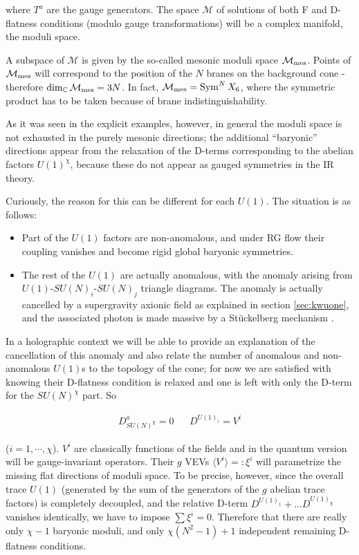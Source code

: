 where $T^a$ are the gauge generators. The space $\mathcal{M}$ of solutions of both F and D-flatness conditions (modulo gauge transformations) will be a complex manifold, the moduli space.

A subspace of $\mathcal{M}$ is given by the so-called mesonic moduli space $\mathcal{M}_\mathrm{mes}$. Points of $\mathcal{M}_\mathrm{mes}$ will correspond to the position of the $N$ branes on the background cone - therefore $\dim_\mathbb{C} \mathcal{M}_\mathrm{mes} = 3N$. In fact, $\mathcal{M}_\mathrm{mes} = \operatorname{Sym}^N X_6$, where the symmetric product has to be taken because of brane indistinguishability.

As it was seen in the explicit examples, however, in general the moduli space is not exhausted in the purely mesonic directions; the additional ``baryonic'' directions appear from the relaxation of the D-terms corresponding to the abelian factors $U(1)^\chi$, because these do not appear as gauged symmetries in the IR theory.

Curiously, the reason for this can be different for each $U(1)$. The situation is as follows:

\begin{itemize}
	\item Part of the $U(1)$ factors are non-anomalous, and under RG flow their coupling vanishes and become rigid global baryonic symmetries.
	\item The rest of the $U(1)$ are actually anomalous, with the anomaly arising from $U(1)$-$SU(N)_i$-$SU(N)_j$ triangle diagrams. The anomaly is actually cancelled by a supergravity axionic field as explained in section \ref{sec:kwuone}, and the associated photon is made massive by a St\"uckelberg mechanism \cite{Martelli:sbv}.
\end{itemize}

In a holographic context we will be able to provide an explanation of the cancellation of this anomaly and also relate the number of anomalous and non-anomalous $U(1)$s to the topology of the cone; for now we are satisfied with knowing their D-flatness condition is relaxed and one is left with only the D-term for the $SU(N)^\chi$ part. So

\begin{align}
	D^a_{SU(N)^\chi} = 0 && D^{U(1)_i} = V^i
	\label{}
\end{align}

($i=1,\cdots,\chi$). $V^i$ are classically functions of the fields and in the quantum version will be gauge-invariant operators. Their $g$ VEVs $\langle V^i \rangle =: \xi^i$ will parametrize the missing flat directions of moduli space. To be precise, however, since the overall trace $U(1)$ (generated by the sum of the generators of the $g$ abelian trace factors) is completely decoupled, and the relative D-term $D^{U(1)_1} + \ldots D^{U(1)_\chi}$ vanishes identically, we have to impose $\sum \xi^i = 0$. Therefore that there are really only $\chi-1$ baryonic moduli, and only $\chi(N^2-1)+1$ independent remaining D-flatness conditions.

